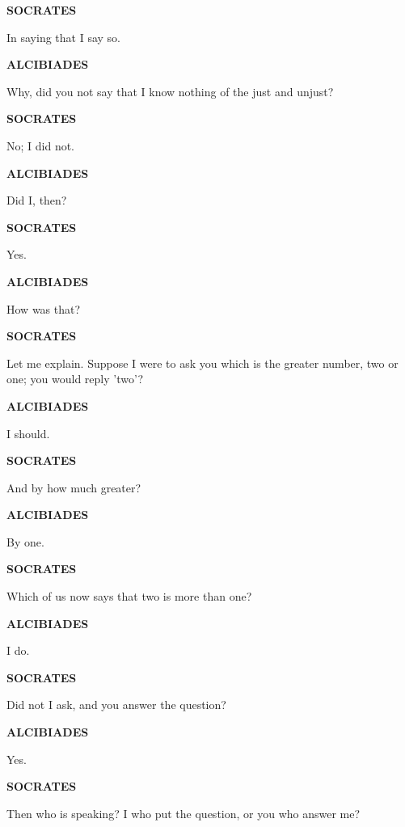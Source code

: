 \documentclass[11pt,letter]{article}
\begin{document}
\par \textbf{SOCRATES}
\par   In saying that I say so.

\par \textbf{ALCIBIADES}
\par   Why, did you not say that I know nothing of the just and unjust?

\par \textbf{SOCRATES}
\par   No; I did not.

\par \textbf{ALCIBIADES}
\par   Did I, then?

\par \textbf{SOCRATES}
\par   Yes.

\par \textbf{ALCIBIADES}
\par   How was that?

\par \textbf{SOCRATES}
\par   Let me explain. Suppose I were to ask you which is the greater number, two or one; you would reply 'two'?

\par \textbf{ALCIBIADES}
\par   I should.

\par \textbf{SOCRATES}
\par   And by how much greater?

\par \textbf{ALCIBIADES}
\par   By one.

\par \textbf{SOCRATES}
\par   Which of us now says that two is more than one?

\par \textbf{ALCIBIADES}
\par   I do.

\par \textbf{SOCRATES}
\par   Did not I ask, and you answer the question?

\par \textbf{ALCIBIADES}
\par   Yes.

\par \textbf{SOCRATES}
\par   Then who is speaking? I who put the question, or you who answer me?
\end{document}
